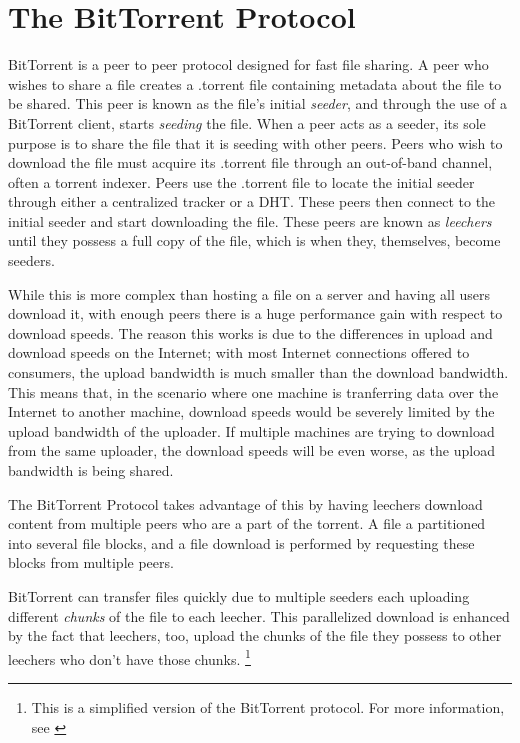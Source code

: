 \documentclass[12pt]{report}
\begin{document}


\section{The BitTorrent Protocol}
\label{sec:thebittorrentprotocol}
BitTorrent is a peer to peer protocol designed for fast file sharing. A peer who wishes to share a file creates a .torrent file containing metadata about the file to be shared. This peer is known as the file's initial \textit{seeder}, and through the use of a BitTorrent client, starts \textit{seeding} the file. When a peer acts as a seeder, its sole purpose is to share the file that it is seeding with other peers. Peers who wish to download the file must acquire its .torrent file through an out-of-band channel, often a torrent indexer. Peers use the .torrent file to locate the initial seeder through either a centralized tracker or a DHT. These peers then connect to the initial seeder and start downloading the file. These peers are known as \textit{leechers} until they possess a full copy of the file, which is when they, themselves, become seeders.

While this is more complex than hosting a file on a server and having all users download it, with enough peers there is a huge performance gain with respect to download speeds. The reason this works is due to the differences in upload and download speeds on the Internet; with most Internet connections offered to consumers, the upload bandwidth is much smaller than the download bandwidth. This means that, in the scenario where one machine is tranferring data over the Internet to another machine, download speeds would be severely limited by the upload bandwidth of the uploader. If multiple machines are trying to download from the same uploader, the download speeds will be even worse, as the upload bandwidth is being shared.

The BitTorrent Protocol takes advantage of this by having leechers download content from multiple peers who are a part of the torrent. A file a partitioned into several file blocks, and a file download is performed by requesting these blocks from multiple peers. %

BitTorrent can transfer files quickly due to multiple seeders each uploading different \textit{chunks} of the file to each leecher. This parallelized download is enhanced by the fact that leechers, too, upload the chunks of the file they possess to other leechers who don't have those chunks. \footnote {This is a simplified version of the BitTorrent protocol. For more information, see \cite{bittorrentProtocol}}
\end{document}
